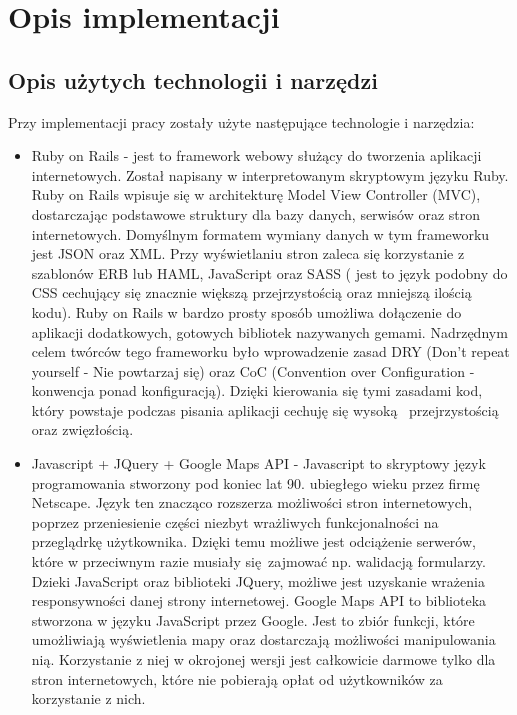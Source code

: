 \chapter{Opis implementacji}
\label{cha:uzywaneTechnologie}

\section{Opis użytych technologii i narzędzi}
\label{sec:technology}
Przy implementacji pracy zostały użyte następujące technologie i narzędzia:
\begin{itemize}
\item Ruby on Rails - jest to framework webowy służący do tworzenia aplikacji internetowych. Został napisany w interpretowanym skryptowym języku Ruby. Ruby on Rails wpisuje się w architekturę Model View Controller (MVC), dostarczając podstawowe struktury dla bazy danych, serwisów oraz stron internetowych. Domyślnym formatem wymiany danych w tym frameworku jest JSON oraz XML. Przy wyświetlaniu stron zaleca się korzystanie z szablonów ERB lub HAML, JavaScript oraz SASS ( jest to język podobny do CSS cechujący się znacznie większą przejrzystością oraz mniejszą ilością kodu). Ruby on Rails w bardzo prosty sposób umożliwa dołączenie do aplikacji dodatkowych, gotowych bibliotek nazywanych gemami. Nadrzędnym celem twórców tego frameworku było wprowadzenie zasad DRY (Don't repeat yourself - Nie powtarzaj się) oraz CoC (Convention over Configuration - konwencja ponad konfiguracją). Dzięki kierowania się tymi zasadami kod, który powstaje podczas pisania aplikacji cechuję się wysoką  przejrzystością oraz zwięzłością.\cite{rails}
\item Javascript + JQuery + Google Maps API - Javascript to skryptowy język programowania stworzony pod koniec lat 90. ubiegłego wieku przez firmę Netscape. Język ten znacząco rozszerza możliwości stron internetowych, poprzez przeniesienie części niezbyt wrażliwych funkcjonalności na przeglądrkę użytkownika. Dzięki temu możliwe jest odciążenie serwerów, które w przeciwnym razie musiały się zajmować np. walidacją formularzy. Dzieki JavaScript oraz biblioteki JQuery, możliwe jest uzyskanie wrażenia responsywności danej strony internetowej. 
Google Maps API to biblioteka stworzona w języku JavaScript przez Google. Jest to zbiór funkcji, które umożliwiają wyświetlenia mapy oraz dostarczają możliwości manipulowania nią. Korzystanie z niej w okrojonej wersji jest całkowicie darmowe tylko dla stron internetowych, które nie pobierają opłat od użytkowników za korzystanie z nich.\\

\end{itemize}

